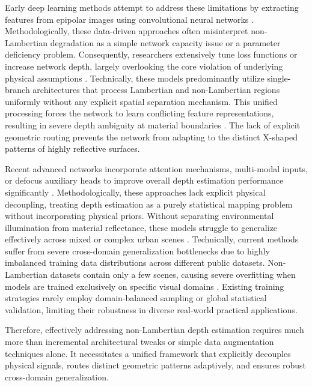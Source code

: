 \documentclass[lettersize,journal]{IEEEtran}
\begin{document}
Early deep learning methods attempt to address these limitations by extracting features from epipolar images using convolutional neural networks \cite{earlyDLLFCNNEPI}. Methodologically, these data-driven approaches often misinterpret non-Lambertian degradation as a simple network capacity issue or a parameter deficiency problem. Consequently, researchers extensively tune loss functions or increase network depth, largely overlooking the core violation of underlying physical assumptions \cite{lossfunctiontuningphysical}. Technically, these models predominantly utilize single-branch architectures that process Lambertian and non-Lambertian regions uniformly without any explicit spatial separation mechanism. This unified processing forces the network to learn conflicting feature representations, resulting in severe depth ambiguity at material boundaries \cite{singlebrancharchitecturedep}. The lack of explicit geometric routing prevents the network from adapting to the distinct X-shaped patterns of highly reflective surfaces.

Recent advanced networks incorporate attention mechanisms, multi-modal inputs, or defocus auxiliary heads to improve overall depth estimation performance significantly \cite{attentionLFdefocusLF}. Methodologically, these approaches lack explicit physical decoupling, treating depth estimation as a purely statistical mapping problem without incorporating physical priors. Without separating environmental illumination from material reflectance, these models struggle to generalize effectively across mixed or complex urban scenes \cite{mixedscenesgeneralization}. Technically, current methods suffer from severe cross-domain generalization bottlenecks due to highly imbalanced training data distributions across different public datasets. Non-Lambertian datasets contain only a few scenes, causing severe overfitting when models are trained exclusively on specific visual domains \cite{dataimbalanceoverfitting}. Existing training strategies rarely employ domain-balanced sampling or global statistical validation, limiting their robustness in diverse real-world practical applications.

Therefore, effectively addressing non-Lambertian depth estimation requires much more than incremental architectural tweaks or simple data augmentation techniques alone. It necessitates a unified framework that explicitly decouples physical signals, routes distinct geometric patterns adaptively, and ensures robust cross-domain generalization.
\end{document}
